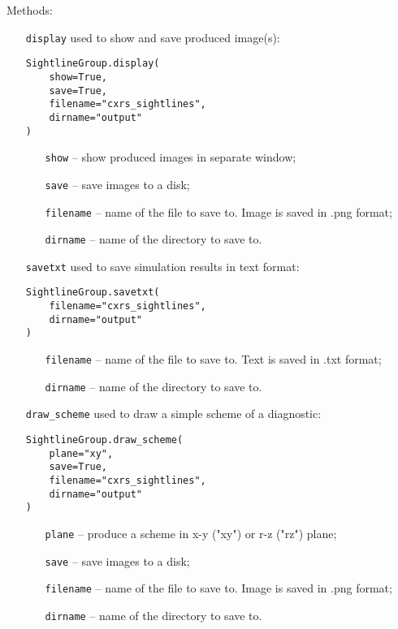 \documentclass[../main.tex]{subfiles}
\begin{document}
Methods:
\begin{itemize}[align=left]
    \item[\texttt{display}] used to show and save produced image(s):
          \begin{verbatim}
SightlineGroup.display(
    show=True,
    save=True,
    filename="cxrs_sightlines",
    dirname="output"
)
        \end{verbatim}
          \begin{itemize}[align=left]
              \item[\texttt{show}] -- show produced images in separate window;
              \item[\texttt{save}] -- save images to a disk;
              \item[\texttt{filename}] -- name of the file to save to. Image is saved in .png format;
              \item[\texttt{dirname}] -- name of the directory to save to.
          \end{itemize}

    \item[\texttt{savetxt}] used to save simulation results in text format:
          \begin{verbatim}
SightlineGroup.savetxt(
    filename="cxrs_sightlines",
    dirname="output"
)
        \end{verbatim}
          \begin{itemize}[align=left]
              \item[\texttt{filename}] -- name of the file to save to. Text is saved in .txt format;
              \item[\texttt{dirname}] -- name of the directory to save to.
          \end{itemize}

    \item[\texttt{draw\_scheme}] used to draw a simple scheme of a diagnostic:
          \begin{verbatim}
SightlineGroup.draw_scheme(
    plane="xy",
    save=True,
    filename="cxrs_sightlines",
    dirname="output"
)
        \end{verbatim}
          \begin{itemize}[align=left]
              \item[\texttt{plane}] -- produce a scheme in x-y ("xy") or r-z ("rz") plane;
              \item[\texttt{save}] -- save images to a disk;
              \item[\texttt{filename}] -- name of the file to save to. Image is saved in .png format;
              \item[\texttt{dirname}] -- name of the directory to save to.
          \end{itemize}
\end{itemize}
\end{document}
